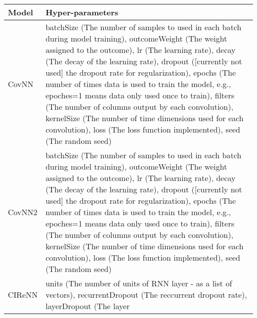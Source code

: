 \documentclass[]{article}
\begin{document}
\begin{longtable}[]{@{}ll@{}}
\toprule
\begin{minipage}[b]{0.12\columnwidth}\raggedright\strut
Model\strut
\end{minipage} & \begin{minipage}[b]{0.82\columnwidth}\raggedright\strut
Hyper-parameters\strut
\end{minipage}\tabularnewline
\midrule
\endhead
\begin{minipage}[t]{0.12\columnwidth}\raggedright\strut
CovNN\strut
\end{minipage} & \begin{minipage}[t]{0.82\columnwidth}\raggedright\strut
batchSize (The number of samples to used in each batch during model
training), outcomeWeight (The weight assigned to the outcome), lr (The
learning rate), decay (The decay of the learning rate), dropout
({[}currently not used{]} the dropout rate for regularization), epochs
(The number of times data is used to train the model, e.g., epoches=1
means data only used once to train), filters (The number of columns
output by each convolution), kernelSize (The number of time dimensions
used for each convolution), loss (The loss function implemented), seed
(The random seed)\strut
\end{minipage}\tabularnewline
\begin{minipage}[t]{0.12\columnwidth}\raggedright\strut
CovNN2\strut
\end{minipage} & \begin{minipage}[t]{0.82\columnwidth}\raggedright\strut
batchSize (The number of samples to used in each batch during model
training), outcomeWeight (The weight assigned to the outcome), lr (The
learning rate), decay (The decay of the learning rate), dropout
({[}currently not used{]} the dropout rate for regularization), epochs
(The number of times data is used to train the model, e.g., epoches=1
means data only used once to train), filters (The number of columns
output by each convolution), kernelSize (The number of time dimensions
used for each convolution), loss (The loss function implemented), seed
(The random seed)\strut
\end{minipage}\tabularnewline
\begin{minipage}[t]{0.12\columnwidth}\raggedright\strut
CIReNN\strut
\end{minipage} & \begin{minipage}[t]{0.82\columnwidth}\raggedright\strut
units (The number of units of RNN layer - as a list of vectors),
recurrentDropout (The reccurrent dropout rate), layerDropout (The layer

\end{minipage}
\end{longtable}
\end{document}
